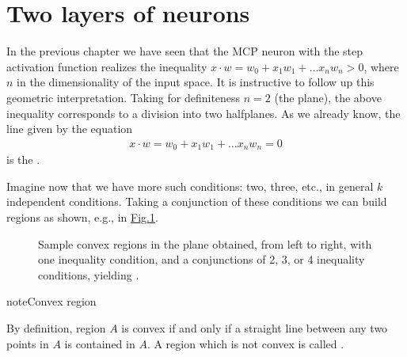 \documentclass[letterpaper,10pt,english]{jupyterBook}
\let\sphinxpxdimen\pdfpxdimen\else\newdimen\sphinxpxdimen
\begin{document}
\section{Two layers of neurons}
\label{\detokenize{docs/more_layers:two-layers-of-neurons}}
\sphinxAtStartPar
In the previous chapter we have seen that the MCP neuron with the step activation function realizes the inequality \(x \cdot w=w_0+x_1 w_1 + \dots x_n w_n > 0\), where \(n\) in the dimensionality of the input space. It is instructive to follow up this geometric interpretation. Taking for definiteness \(n=2\) (the plane), the above inequality corresponds to a division into two half\sphinxhyphen{}planes. As we already know, the line given by the equation
\begin{equation*}
\begin{split}x \cdot w=w_0+x_1 w_1 + \dots x_n w_n = 0\end{split}
\end{equation*}
\sphinxAtStartPar
is the .

\sphinxAtStartPar
Imagine now that we have more such conditions: two, three, etc., in general \(k\) independent conditions. Taking a conjunction of these conditions we can build regions as shown, e.g., in \hyperref[\detokenize{docs/more_layers:regions-fig}]{Fig.\@ \ref{\detokenize{docs/more_layers:regions-fig}}}.

\begin{figure}[htbp]
\centering
\capstart

\noindent\sphinxincludegraphics[width=620\sphinxpxdimen]{{regions}.png}
\caption{Sample convex regions in the plane obtained, from left to right, with one inequality condition, and a conjunctions of 2, 3, or 4 inequality conditions, yielding .}\label{\detokenize{docs/more_layers:regions-fig}}\end{figure}

\begin{sphinxadmonition}{note}{Convex region}

\sphinxAtStartPar
By definition, region \(A\) is convex if and only if a straight line between any two points in \(A\) is contained in \(A\). A region which is not convex is called .
\end{sphinxadmonition}
\end{document}

